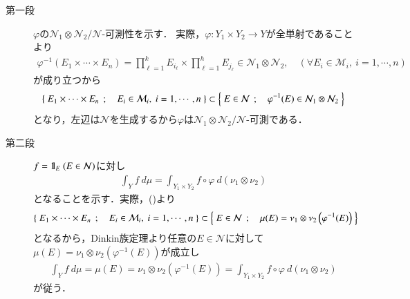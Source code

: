 	\begin{prf}\mbox{}
		\begin{description}
			\item[第一段]
				$\varphi$の$\mathcal{N}_1 \otimes \mathcal{N}_2/\mathcal{N}$-可測性を示す．
				実際，$\varphi:Y_1 \times Y_2 \longrightarrow Y$が全単射であることより
				\begin{align}
					\varphi^{-1}(E_1 \times \cdots \times E_n)
					= \prod_{\ell=1}^k E_{i_\ell} \times \prod_{\ell=1}^h E_{j_\ell}
					\in \mathcal{N}_1 \otimes \mathcal{N}_2,
					\quad (\forall E_i \in \mathcal{M}_i,\ i=1,\cdots,n)
					\label{eq:Fubini_theorem_n_variables_1}
				\end{align}
				が成り立つから
				\begin{align}
					\left\{\ E_1 \times \cdots \times E_n\ \, ; \quad E_i \in \mathcal{M}_i,\ i=1,\cdots,n\ \right\}
					\subset \left\{\ E \in \mathcal{N}\ \, ; \quad \varphi^{-1}(E) \in \mathcal{N}_1 \otimes \mathcal{N}_2\ \right\}
				\end{align}
				となり，左辺は$\mathcal{N}$を生成するから$\varphi$は$\mathcal{N}_1 \otimes \mathcal{N}_2/\mathcal{N}$-可測である．
				
			\item[第二段]
				$f = \mbox{1}\hspace{-0.25em}\mbox{l}_E\ (E \in \mathcal{N})$に対し
				\begin{align}
					\int_Y f\ d\mu 
					= \int_{Y_1 \times Y_2} f \circ \varphi\ d(\nu_1 \otimes \nu_2)
				\end{align}
				となることを示す．実際，()より
				\begin{align}
					\left\{\ E_1 \times \cdots \times E_n\ \, ; \quad E_i \in \mathcal{M}_i,\ i=1,\cdots,n\ \right\}
					\subset \left\{\ E \in \mathcal{N}\ \, ; \quad \mu(E) = \nu_1 \otimes \nu_2\left( \varphi^{-1}(E) \right)\ \right\}
				\end{align}
				となるから，Dinkin族定理より任意の$E \in \mathcal{N}$に対して
				$\mu(E) = \nu_1 \otimes \nu_2\left( \varphi^{-1}(E) \right)$が成立し
				\begin{align}
					\int_Y f\ d\mu
					= \mu(E)
					= \nu_1 \otimes \nu_2\left( \varphi^{-1}(E) \right)
					= \int_{Y_1 \times Y_2} f \circ \varphi\ d(\nu_1 \otimes \nu_2)
				\end{align}
				が従う．
		\end{description}
	\end{prf}